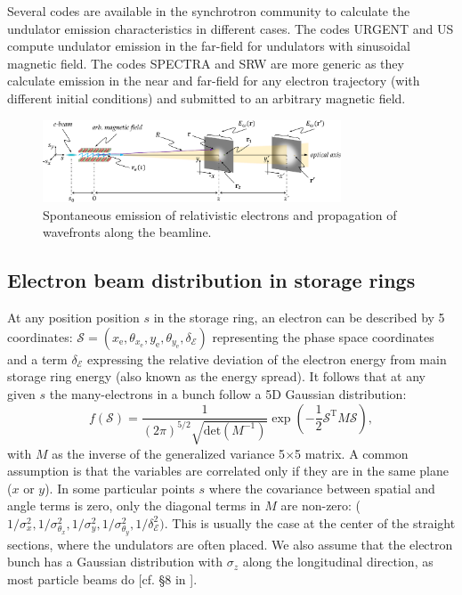 \documentclass{iucr}              %
\begin{document}
Several codes are available in the synchrotron community to calculate the undulator emission characteristics in different cases. The codes URGENT \cite{codeURGENT} and US \cite{codeUS} compute undulator emission in the far-field for undulators with sinusoidal magnetic field. The codes SPECTRA \cite{Tanaka2001} and SRW \cite{codeSRW} are more generic as they calculate emission in the near and far-field for any electron trajectory (with different initial conditions) and submitted to an arbitrary magnetic field.

\onecolumn
\begin{figure}\label{fig:coordinates}
    \centering
    \includegraphics[width=0.79\textwidth]{figures/coordinates.pdf}
    \caption{Spontaneous emission of relativistic electrons and propagation of wavefronts along the beamline.}
\end{figure}
\newpage
\twocolumn

\subsection{Electron beam distribution in storage rings}
\label{sec:electronbeam}

At any position position $s$ in the storage ring, an electron can be described by 5 coordinates:
$\mathcal{S}= (x_\text{e},\theta_{x_\text{e}},y_\text{e},   \theta_{y_\text{e}},\delta_\mathcal{E})$ representing the phase space coordinates and a term $\delta_\mathcal{E}$ expressing the relative deviation of the electron energy from main storage ring energy (also known as the energy spread). It follows that at any given $s$ the many-electrons in a bunch follow a 5D Gaussian distribution:
\begin{equation}\label{eq:f-electrons}
f(\mathcal{S}) = \frac{1}{(2 \pi)^{5/2} \sqrt{\text{det}(M^{-1})}} \exp
        \left( -\frac{1}{2} \mathcal{S}^\text{T} M \mathcal{S} \right),
\end{equation}
with $M$ as the inverse of the generalized variance 5$\times$5 matrix. A common assumption is that the variables are correlated only if they are in the same plane ($x$ or $y$). In some particular points $s$ where the covariance between spatial and angle terms is zero, only the diagonal terms in $M$ are non-zero: ($1/\sigma_x^2,1/\sigma_{\theta_x}^2,1/\sigma_y^2,1/\sigma_{\theta_y}^2,1/\delta_\mathcal{E}^2)$. This is usually the case at the center of the straight sections, where the undulators are often placed.  We also assume that the electron bunch has a Gaussian distribution with $\sigma_z$ along the longitudinal direction, as most particle beams do [cf. \S8 in \cite{Wiedemann2015}].
 
\end{document}
